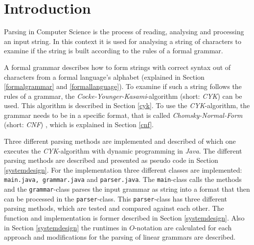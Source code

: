 \documentclass[a4paper, 11pt]{article}
\begin{document}
\setcounter{page}{1}


\begin{spacing}{1}


\newpage
\fancyhead[LO]{\empty}
{
  \hypersetup{linkcolor=black}
  \tableofcontents
}

\end{spacing}

\newpage















\section{Introduction}

Parsing in Computer Science is the process  of reading, analysing and processing an input string. In this context it is used for analysing a string of characters to examine if the string is built according to the rules of a formal grammar. 

A formal grammar describes how to form strings with correct syntax out of characters from a formal language's alphabet (explained in Section \ref{formalgrammar} and \ref{formallanguage}).
To examine if such a string follows the rules of a grammar, the \textit{Cocke-Younger-Kasami}-algorithm (short: \textit{CYK}) can be used. This algorithm is described in Section \ref{cyk}. To use the \textit{CYK}-algorithm, the grammar needs to be in a specific format, that is called \textit{Chomsky-Normal-Form} (short: \textit{CNF})  \cite{CYK_name, CYK1}, which is explained in Section \ref{cnf}.


Three different parsing methods are implemented and described of which one executes the \textit{CYK}-algorithm with dynamic programming in \textit{Java}. The different parsing methods are described and presented as pseudo code in Section \ref{systemdesign}.
For the implementation three different classes are implemented: \texttt{main.java, grammar.java} and \texttt{parser.java}. The \texttt{main}-class calls the methods and the \texttt{grammar}-class parses the input grammar as string into a format that then can be processed in the \texttt{parser}-class. This \texttt{parser}-class has three different parsing methods, which are tested and compared against each other.
The function and implementation is former described in Section \ref{systemdesign}. Also in Section \ref{systemdesign} the runtimes in $O$-notation are calculated for each approach and modifications for the parsing of linear grammars are described.
\end{document}
